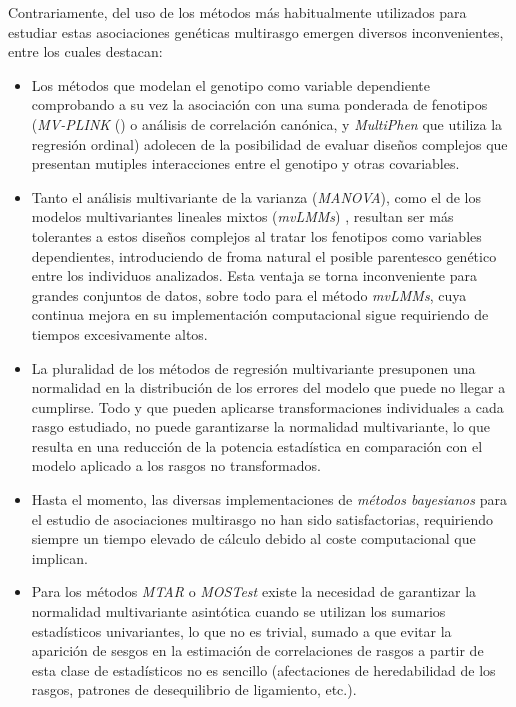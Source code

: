 \documentclass[IB,BIB]{TFUOC}%
\begin{document}
Contrariamente, del uso de los métodos más habitualmente utilizados para estudiar estas asociaciones genéticas multirasgo emergen diversos inconvenientes, entre los cuales destacan:

{\small
\begin{itemize}
    \item Los métodos que modelan el genotipo como variable dependiente comprobando a su vez la asociación con una suma ponderada de fenotipos (\textit{MV-PLINK} (\cite{ferreira_multivariate_2009}) o análisis de correlación canónica, y \textit{\gls{MultiPhen}} \cite{coin_multiphen_2020} que utiliza la regresión ordinal) adolecen de la posibilidad de evaluar diseños complejos que presentan mutiples interacciones entre el genotipo y otras covariables.
    \item Tanto el análisis multivariante de la varianza (\textit{\gls{MANOVA}}), como el de los modelos multivariantes lineales mixtos (\textit{\gls{mvLMMs}}) \cite{zhou_efficient_2014}, resultan ser más tolerantes a estos diseños complejos al tratar los fenotipos como variables dependientes, introduciendo de froma natural el posible parentesco genético entre los individuos analizados. Esta ventaja se torna inconveniente para grandes conjuntos de datos, sobre todo para el método \textit{mvLMMs}, cuya continua mejora en su implementación computacional sigue requiriendo de tiempos excesivamente altos. 
    \item La pluralidad de los métodos de regresión multivariante presuponen una normalidad en la distribución de los errores del modelo que puede no llegar a cumplirse. Todo y que pueden aplicarse transformaciones individuales a cada rasgo estudiado, no puede garantizarse la normalidad multivariante, lo que resulta en una reducción de la potencia estadística en comparación con el modelo aplicado a los rasgos no transformados.
    \item Hasta el momento, las diversas implementaciones de \textit{métodos bayesianos} para el estudio de asociaciones multirasgo no han sido satisfactorias, requiriendo siempre un tiempo elevado de cálculo debido al coste computacional que implican.
    \item Para los métodos \textit{\gls{MTAR}} \cite{luo_multi-trait_2020} o \textit{\gls{MOSTest}} \cite{noauthor_precimedmostest_2023} \cite{van_der_meer_understanding_2020} existe la necesidad de garantizar la normalidad multivariante asintótica cuando se utilizan los sumarios estadísticos univariantes, lo que no es trivial, sumado a que evitar la aparición de sesgos en la estimación de correlaciones de rasgos a partir de esta clase de estadísticos no es sencillo (afectaciones de heredabilidad de los rasgos, patrones de desequilibrio de ligamiento, etc.).
\end{itemize}}
\end{document}
